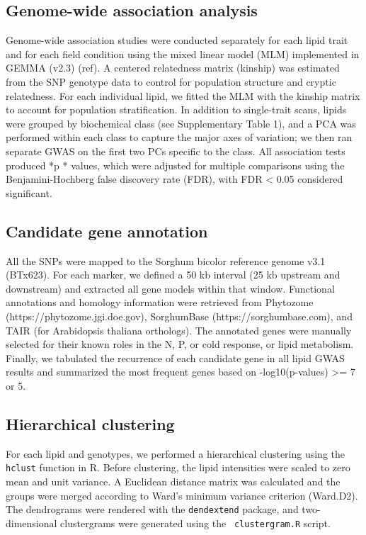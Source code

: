 \documentclass[10pt,letterpaper]{article}
\begin{document}
\subsection*{Genome-wide association analysis}  
Genome-wide association studies were conducted separately for each lipid trait and for each field condition using the mixed linear model (MLM) implemented in GEMMA (v2.3) (ref).  A centered relatedness matrix (kinship) was estimated from the SNP genotype data to control for population structure and cryptic relatedness.  For each individual lipid, we fitted the MLM with the kinship matrix to account for population stratification.  In addition to single-trait scans, lipids were grouped by biochemical class (see Supplementary Table 1), and a PCA was performed within each class to capture the major axes of variation; we then ran separate GWAS on the first two PCs specific to the class.  All association tests produced *p * values, which were adjusted for multiple comparisons using the Benjamini-Hochberg false discovery rate (FDR), with FDR < 0.05 considered significant.

\subsection*{Candidate gene annotation}  
All the SNPs were mapped to the Sorghum bicolor reference genome v3.1 (BTx623).  For each marker, we defined a 50 kb interval (25 kb upstream and downstream) and extracted all gene models within that window.  Functional annotations and homology information were retrieved from Phytozome (https://phytozome.jgi.doe.gov), SorghumBase (https://sorghumbase.com), and TAIR (for Arabidopsis thaliana orthologs).  The annotated genes were manually selected for their known roles in the N, P, or cold response, or lipid metabolism.  Finally, we tabulated the recurrence of each candidate gene in all lipid GWAS results and summarized the most frequent genes based on -log10(p-values) >= 7 or 5.

\subsection*{Hierarchical clustering}
For each lipid and genotypes, we performed a hierarchical clustering using the \texttt{hclust} function in R.  Before clustering, the lipid intensities were scaled to zero mean and unit variance.  A Euclidean distance matrix was calculated and the groups were merged according to Ward's minimum variance criterion (Ward.D2).  The dendrograms were rendered with the \texttt{dendextend} package, and two-dimensional clustergrams were generated using the \texttt{ clustergram.R} script.  
\end{document}
